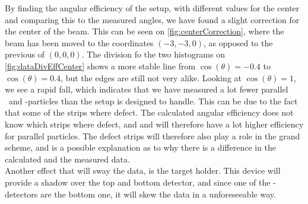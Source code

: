 By finding the angular efficiency of the setup, with different values for the center and comparing this to the measured angles, we have found a slight correction for the center of the beam. This can be seen on \cref{fig:centerCorrection}, where the beam has been moved to the coordinates $(-3, -3, 0)$, as opposed to the previous of $(0, 0, 0)$. The division fo the two histograms on \cref{fig:dataDivEffCenter} shows a more stable line from $\cos(\theta)= -0.4$ to $\cos(\theta) = 0.4$, but the edges are still not very alike. Looking at $\cos(\theta) = 1$, we see a rapid fall, which indicates that we have measured a lot fewer parallel \be\ and \al-particles than the setup is designed to handle. 
This can be due to the fact that some of the strips where defect. The calculated angular efficiency does not know which strips where defect, and and will therefore have a lot higher efficiency for parallel particles. The defect strips will therefore also play a role in the grand scheme, and is a possible explanation as to why there is a difference in the calculated and the measured data. \\
Another effect that will sway the data, is the target holder. This device will provide a shadow over the top and bottom detector, and since one of the \be-detectors are the bottom one, it will skew the data in a unforeseeable way. 
